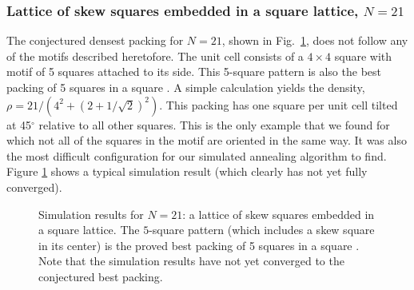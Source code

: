 \documentclass[aps]{revtex4}
\begin{document}
\subsubsection{Lattice of skew squares embedded in a square lattice, $N=21$}
The conjectured densest packing for  $N=21$, shown in Fig.\ \ref{fig:n21}, does not follow any of the motifs described heretofore. The unit cell consists of a $4 \times 4$ square with motif of 5 squares attached to its side.  This 5-square pattern is also the best packing of 5 squares in a square \cite{Friedman2002}.  A simple calculation yields the density, $\rho= 21/(4^2+(2+1/\sqrt{2})^2)$. This packing has one square per unit cell tilted at 45$^{\circ}$ relative to all other squares.  This is the only example that we found for which not all of the squares in the motif are oriented in the same way. It was also the most difficult configuration for our simulated annealing algorithm to find. Figure \ref{fig:n21} shows a typical simulation result (which clearly has not yet fully converged).

\begin{figure}[H]
\caption{\label{fig:n21}Simulation results for $N=21$: a lattice of skew squares embedded in a square lattice.  The $5$-square pattern (which includes a skew square in its center) is the proved best packing of 5 squares in a square \cite{Friedman2002}. Note that the simulation results have not yet converged to the conjectured best packing.} \end{figure}
\end{document}
